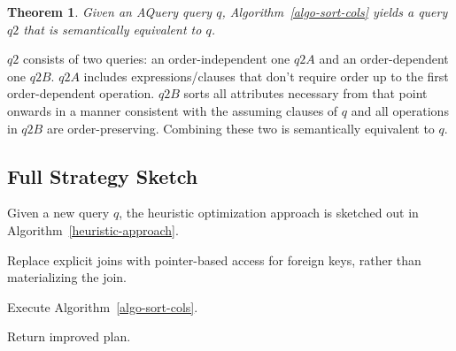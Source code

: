 \documentclass{acm_proc_article-sp}
\makeatletter
\let\proof\relax
\let\endproof\relax
\newenvironment{proofsketch}{%
  \renewcommand{\proofname}{Proof Sketch}\proof}{\endproof}
\newenvironment{Ualgorithm}[1][htpb]
  {\def\@algocf@post@ruled{\kern\interspacealgoruled\hrule  height\algoheightrule\kern3pt\relax}%
    \def\@algocf@capt@ruled{under}
    \begin{algorithm}[#1]}
  {\end{algorithm}}
\newtheorem{theorem}{Theorem}[section]
\makeatother
\begin{document}
\begin{Ualgorithm}
\caption{Identifying order of evaluation and attributes to sort. \newline
Once an order-dependent predicate is found, all attributes in the following predicates in the where- clause and all attributes in 
subsequent clauses must be sorted. If there are no order-dependent predicates
in the where clause, then if any predicate in the group-clause is order-dependent, then every attribute in the group, having, and projection clauses must be sorted. 
Once the sorting takes place, all operations must be order-preserving. So for example, selections in $W$ after the first order-dependent predicate must all be 
order-preserving. Similarly for the remaining clauses.}
\label{algo-sort-cols}	
\end{Ualgorithm}


\begin{theorem}
Given an AQuery query $q$, Algorithm~\ref{algo-sort-cols} yields a query $q2$
that is semantically equivalent to $q$.
\end{theorem}

\begin{proofsketch}
$q2$ consists of two queries: an order-independent one $q2A$ and an order-dependent one $q2B$.
$q2A$ includes 
expressions/clauses that don't require order up to the first order-dependent
operation. 
$q2B$ sorts all attributes necessary from that point onwards in a manner consistent with the assuming clauses of $q$ and all operations in $q2B$
are order-preserving.
Combining these two is semantically equivalent to $q$.
\end{proofsketch}



\subsection{Full Strategy Sketch}
Given a new query $q$, the heuristic optimization approach is sketched out in Algorithm~\ref{heuristic-approach}.


\begin{Ualgorithm}

	
	 {
	Replace explicit joins with pointer-based access for foreign keys, rather than materializing the join.
	}
	
	Execute Algorithm~\ref{algo-sort-cols}.
	
	Return improved plan.\\


\caption{A Sketch of Optimizations}
\label{heuristic-approach}	
\end{Ualgorithm}
\end{document}
